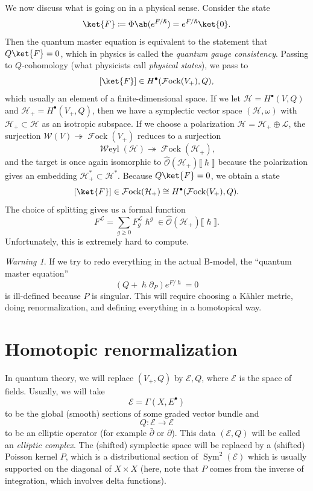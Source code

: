 \documentclass{amsart}
\theoremstyle{definition}
\theoremstyle{remark}
\newtheorem{warn}[thm]{Warning}
\theoremstyle{plain}
\theoremstyle{definition}
\theoremstyle{remark}
\newcommand{\mc}[1]{\mathcal{#1}}
\newcommand{\on}[1]{\operatorname{#1}}
\newcommand{\1}{\mathbf{1}}
\newcommand{\2}{\mathbf{2}}
\newcommand{\3}{\mathbf{3}}
\newcommand{\ps}[1]{\lBrack #1 \rBrack}
\newcommand{\dbar}{\bar{\partial}}
\DeclareMathOperator{\Sym}{Sym}
\DeclareMathOperator{\Fock}{\mc{F}ock}
\begin{document}
We now discuss what is going on in a physical sense. Consider the state
\[ \ket{F} \coloneqq \Phi \ab(e^{F/\hslash}) = e^{F/\hslash} \ket{0}. \]
Then the quantum master equation is equivalent to the statement that \(Q \ket{F} = 0\), which in physics is called the \textit{quantum gauge consistency}. Passing to \(Q\)-cohomology (what physicists call \textit{physical states}), we pass to
\[ [\ket{F}] \in H^{\bullet}(\Fock(V_+), Q), \]
which usually an element of a finite-dimensional space. If we let \(\mc{H} = H^{\bullet}(V, Q)\) and \(\mc{H}_+ = H^{\bullet}(V_+, Q)\), then we have a symplectic vector space \((\mc{H}, \omega)\) with \(\mc{H}_+ \subset \mc{H}\) as an isotropic subspace. If we choose a polarization \(\mc{H} = \mc{H}_+ \oplus \mc{L}\), the surjection \(\mc{W}(V) \twoheadrightarrow \Fock(V_+)\) reduces to a surjection
\[ \on{\mc{W}eyl}(\mc{H}) \twoheadrightarrow \Fock(\mc{H}_+), \]
and the target is once again isomorphic to \(\hat{\mc{O}}(\mc{H}_+) \ps{\hslash}\) because the polarization gives an embedding \(\mc{H}_+^*\subset\mc{H}^*\). Because \(Q \ket{F} = 0\), we obtain a state
\[ [\ket{F}] \in \Fock(\mc{H}_+) \cong H^{\bullet}(\Fock(V_+), Q). \]
The choice of splitting gives us a formal function
\[ F^{\mc{L}} = \sum_{g \geq 0} F_g^{\mc{L}} \hslash^g \in \hat{\mc{O}}(\mc{H}_+) \ps{\hslash}. \]
Unfortunately, this is extremely hard to compute.

\begin{warn}
    If we try to redo everything in the actual B-model, the ``quantum master equation''
    \[ (Q + \hslash \partial_P) e^{F/\hslash} = 0 \]
    is ill-defined because \(P\) is singular. This will require choosing a K\"ahler metric, doing renormalization, and defining everything in a homotopical way.
\end{warn}




\section{Homotopic renormalization}%
\label{sec:Homotopic renormalization}

In quantum theory, we will replace \((V_+, Q)\) by \(\mc{E}, Q\), where \(\mc{E}\) is the space of fields. Usually, we will take
\[ \mc{E} = \Gamma(X, E^{\bullet}) \]
to be the global (smooth) sections of some graded vector bundle and 
\[ Q \colon \mc{E} \to \mc{E} \]
to be an elliptic operator (for example \(\dbar\) or \(\partial\)). This data \((\mc{E}, Q)\) will be called an \textit{elliptic complex}. The (shifted) symplectic space will be replaced by a (shifted) Poisson kernel \(P\), which is a distributional section of \(\Sym^2(\mc{E})\) which is usually supported on the diagonal of \(X \times X\) (here, note that \(P\) comes from the inverse of integration, which involves delta functions).
\end{document}
